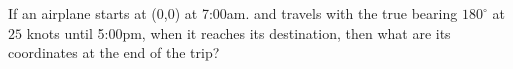 \documentclass{ximera}
\author{Parisa Fatheddin}
\begin{document}
\begin{exercise}

If an airplane starts at (0,0) at 7:00am. and travels with the true bearing $180^\circ$ at $25$ knots until 5:00pm, when it reaches its destination, then what are its coordinates at the end of the trip? 

\begin{prompt}
\end{prompt}
































\end{exercise}
\end{document}
